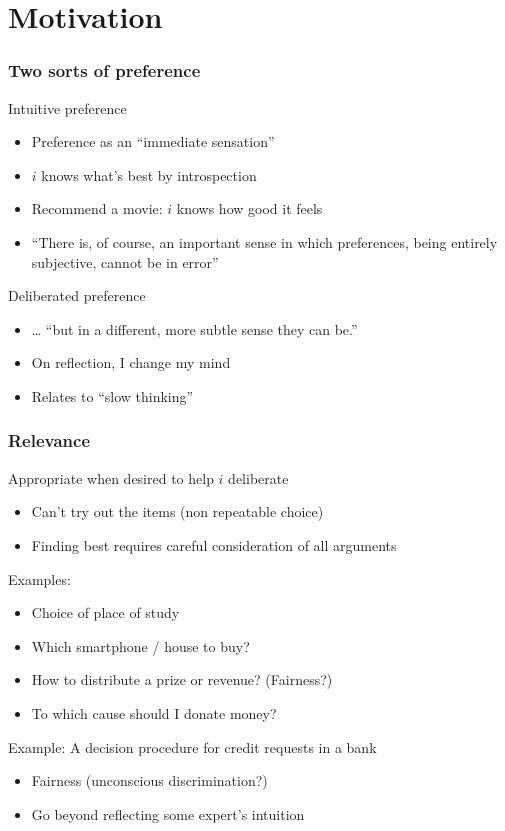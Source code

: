 \documentclass[french,english]{beamer}
\begin{document}
\section{Motivation}
\begin{frame}
	\frametitle{Two sorts of preference}
	\begin{block}{Intuitive preference}
		\begin{itemize}
			\item Preference as an “immediate sensation” \citep{von_neumann_theory_1944}
			\item $i$ knows what’s best by introspection
			\item Recommend a movie: $i$ knows how good it feels
			\item “There is, of course, an important sense in which preferences, being entirely subjective, cannot be in error” \citep{savage_foundations_1972}
		\end{itemize}
	\end{block}
	\begin{block}{Deliberated preference}
		\begin{itemize}
			\item … “but in a different, more subtle sense they can be.”
			\item On reflection, I change my mind
			\item Relates to “slow thinking” \citep{kahneman_thinking_2013}
		\end{itemize}
	\end{block}
\end{frame}

\begin{frame}
	\frametitle{Relevance}
	Appropriate when desired to help $i$ deliberate
	\begin{itemize}
		\item Can’t try out the items (non repeatable choice)
		\item Finding best requires careful consideration of all arguments
	\end{itemize}
	Examples:
	\begin{itemize}
		\item Choice of place of study
		\item Which smartphone / house to buy? 
		\item How to distribute a prize or revenue? (Fairness?)
		\item To which cause should I donate money?
	\end{itemize}
	\begin{exampleblock}{Example: A decision procedure for credit requests in a bank}
		\begin{itemize}
			\item Fairness (unconscious discrimination?)
			\item Go beyond reflecting some expert’s intuition
		\end{itemize}
	\end{exampleblock}
\end{frame}
\end{document}
